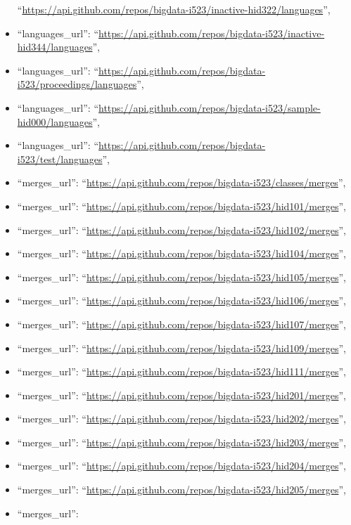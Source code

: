 \begin{itemize}
  ``\url{https://api.github.com/repos/bigdata-i523/inactive-hid322/languages}'',
\item
  ``languages\_url'':
  ``\url{https://api.github.com/repos/bigdata-i523/inactive-hid344/languages}'',
\item
  ``languages\_url'':
  ``\url{https://api.github.com/repos/bigdata-i523/proceedings/languages}'',
\item
  ``languages\_url'':
  ``\url{https://api.github.com/repos/bigdata-i523/sample-hid000/languages}'',
\item
  ``languages\_url'':
  ``\url{https://api.github.com/repos/bigdata-i523/test/languages}'',
\item
  ``merges\_url'':
  ``\url{https://api.github.com/repos/bigdata-i523/classes/merges}'',
\item
  ``merges\_url'':
  ``\url{https://api.github.com/repos/bigdata-i523/hid101/merges}'',
\item
  ``merges\_url'':
  ``\url{https://api.github.com/repos/bigdata-i523/hid102/merges}'',
\item
  ``merges\_url'':
  ``\url{https://api.github.com/repos/bigdata-i523/hid104/merges}'',
\item
  ``merges\_url'':
  ``\url{https://api.github.com/repos/bigdata-i523/hid105/merges}'',
\item
  ``merges\_url'':
  ``\url{https://api.github.com/repos/bigdata-i523/hid106/merges}'',
\item
  ``merges\_url'':
  ``\url{https://api.github.com/repos/bigdata-i523/hid107/merges}'',
\item
  ``merges\_url'':
  ``\url{https://api.github.com/repos/bigdata-i523/hid109/merges}'',
\item
  ``merges\_url'':
  ``\url{https://api.github.com/repos/bigdata-i523/hid111/merges}'',
\item
  ``merges\_url'':
  ``\url{https://api.github.com/repos/bigdata-i523/hid201/merges}'',
\item
  ``merges\_url'':
  ``\url{https://api.github.com/repos/bigdata-i523/hid202/merges}'',
\item
  ``merges\_url'':
  ``\url{https://api.github.com/repos/bigdata-i523/hid203/merges}'',
\item
  ``merges\_url'':
  ``\url{https://api.github.com/repos/bigdata-i523/hid204/merges}'',
\item
  ``merges\_url'':
  ``\url{https://api.github.com/repos/bigdata-i523/hid205/merges}'',
\item
  ``merges\_url'':

\end{itemize}
